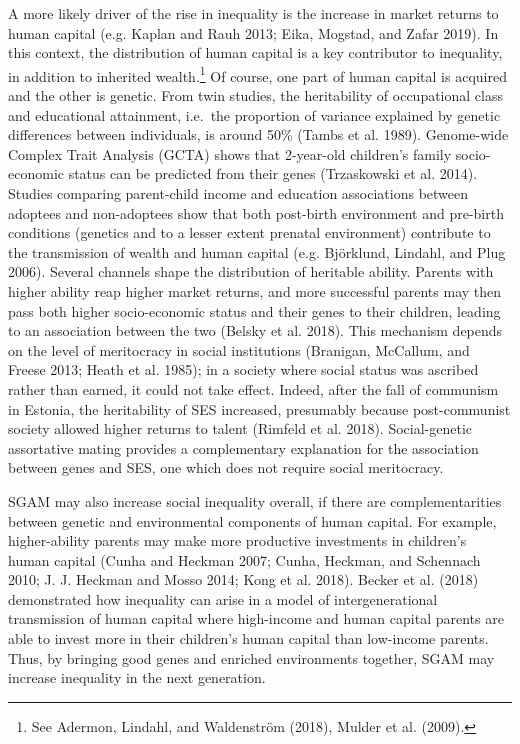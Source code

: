 \documentclass[
]{article}
\begin{document}
A more likely driver of the rise in inequality is the increase in market returns
to human capital (e.g. Kaplan and Rauh 2013; Eika, Mogstad, and Zafar 2019). In this context, the
distribution of human capital is a key contributor to inequality, in addition to
inherited wealth.\footnote{See Adermon, Lindahl, and Waldenström (2018), Mulder et al. (2009).} Of course, one part of human capital is acquired and
the other is genetic. From twin studies, the heritability of occupational class
and educational attainment, i.e.~the proportion of variance explained by genetic
differences between individuals, is around 50\% (Tambs et al. 1989). Genome-wide
Complex Trait Analysis (GCTA) shows that 2-year-old children's family
socio-economic status can be predicted from their genes (Trzaskowski et al. 2014).
Studies comparing parent-child income and education associations between
adoptees and non-adoptees show that both post-birth environment and pre-birth
conditions (genetics and to a lesser extent prenatal environment) contribute to
the transmission of wealth and human capital (e.g. Björklund, Lindahl, and Plug 2006).
Several channels shape the distribution of heritable ability. Parents with
higher ability reap higher market returns, and more successful parents may then
pass both higher socio-economic status and their genes to their children,
leading to an association between the two (Belsky et al. 2018). This mechanism
depends on the level of meritocracy in social institutions
(Branigan, McCallum, and Freese 2013; Heath et al. 1985); in a society where social status was
ascribed rather than earned, it could not take effect. Indeed, after the fall of
communism in Estonia, the heritability of SES increased, presumably because
post-communist society allowed higher returns to talent (Rimfeld et al. 2018).
Social-genetic assortative mating provides a complementary explanation for the
association between genes and SES, one which does not require social meritocracy.

SGAM may also increase social inequality overall, if there are complementarities
between genetic and environmental components of human capital. For example,
higher-ability parents may make more productive investments in children's human
capital (Cunha and Heckman 2007; Cunha, Heckman, and Schennach 2010; J. J. Heckman and Mosso 2014; Kong et al. 2018). Becker et al. (2018) demonstrated how inequality
can arise in a model of intergenerational transmission of human capital where
high-income and human capital parents are able to invest more in their
children's human capital than low-income parents. Thus, by bringing good genes
and enriched environments together, SGAM may increase inequality in the next
generation.
\end{document}
